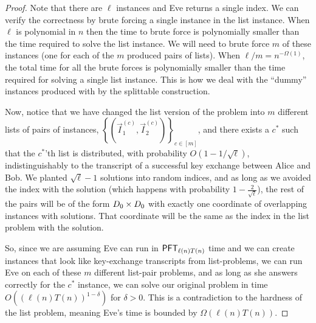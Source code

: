 \begin{proof}
	Note that there are $\ell$ instances and Eve returns a single index. We can verify the correctness by brute forcing a single instance in the list instance. When $\ell$ is polynomial in $n$ then the time to brute force is polynomially smaller than the time required to solve the list instance. We will need to brute force $m$ of these instances (one for each of the $m$ produced pairs of lists). When $\ell/m = n^{-\Omega(1)}$, the total time for all the brute forces is polynomially smaller than the time required for solving a single list instance. This is how we deal with the ``dummy'' instances produced with by the splittable construction. 
	
	Now, notice that we have changed the list version of the problem into $m$ different lists of pairs of instances, $\left\{ \left(\vec I_1^{(c)}, \vec I_2^{(c)}\right) \right\}_{c \in [m]}$, and there exists a $c^*$ such that the $c^*$'th list is distributed, with probability $O(1 - 1/\sqrt \ell)$, indistinguishably to the transcript of a successful key exchange between Alice and Bob. We planted $\sqrt \ell - 1$ solutions into random indices, and as long as we avoided the index with the solution (which happens with probability $1 - \frac 2 {\sqrt \ell}$), the rest of the pairs will be of the form $D_0 \times D_0$ with exactly one coordinate of overlapping instances with solutions. That coordinate will be the same as the index in the list problem with the solution.
	
	So, since we are assuming Eve can run in $\mathsf{PFT}_{\ell(n) T(n)}$ time and we can create instances that look like key-exchange transcripts from list-problems, we can run Eve on each of these $m$ different list-pair problems, and as long as she answers correctly for the $c^*$ instance, we can solve our original problem in time $O((\ell(n)T(n))^{1 - \delta})$ for $\delta > 0$. This is a contradiction to the hardness of the list problem, meaning Eve's time is bounded by $\Omega(\ell(n) T(n))$.
	

\end{proof}
